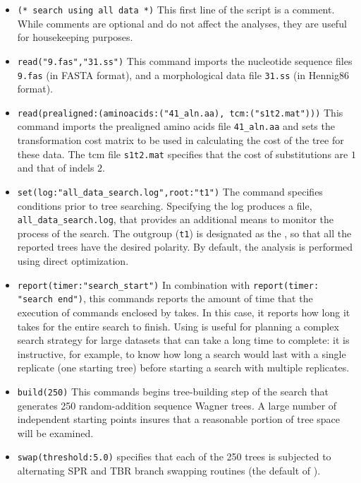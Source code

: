 \begin{itemize}
\item \texttt{(* search using all data *)} This first line of the script is a comment. While comments are optional 
and do not affect the analyses, they are useful for housekeeping purposes.
\item \texttt{read("9.fas","31.ss")} This command imports the nucleotide sequence files \texttt{9.fas} (in FASTA 
format), and a morphological data file \texttt{31.ss} (in Hennig86 format).
\item \texttt{read(prealigned:(aminoacids:("41\_aln.aa), tcm:("s1t2.mat")))} This command imports the prealigned
amino acids file \texttt{41\_aln.aa} and sets the transformation cost matrix to be used in calculating the cost of the tree
for these data.  The tcm file \texttt{s1t2.mat} specifies that the cost of substitutions are $1$ and that of indels $2$.
\item \texttt{set(log:"all\_data\_search.log",root:"t1")} The  command specifies 
conditions prior to tree searching. Specifying the log 
produces a file, \texttt{all\_data\_search.log}, that provides an additional means to monitor the process 
of the search. The outgroup (\texttt{t1}) is designated as the , so that all the 
reported trees have the desired polarity. By default, the analysis is performed using direct optimization.
\item \texttt{report(timer:"search\_start")} In combination with \texttt{report(timer:\\"search end")}, this commands 
reports the amount of time that the execution of commands enclosed by  takes. In this 
case, it reports how long it takes for the entire search to finish. Using  is useful for planning a complex 
search strategy for large datasets that can take a long time to complete: it is instructive, for example, to know 
how long a search would last with a single replicate (one starting tree) before starting a search with multiple 
replicates.
\item \texttt{build(250)} This commands begins tree-building step of the search that generates 250 
random-addition sequence Wagner trees. A large number of independent starting points insures that a reasonable portion of tree 
space will be examined.
\item \texttt{swap(threshold:5.0)}  specifies that each of the 250 trees is subjected to 
alternating SPR and TBR branch swapping routines (the default of \poy). 

\end{itemize}
